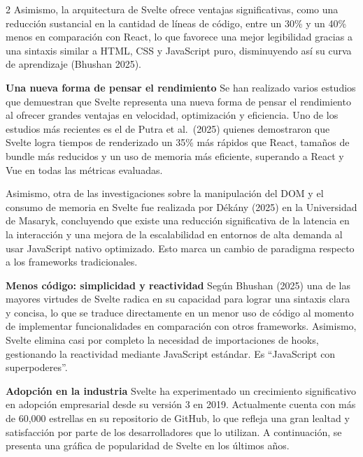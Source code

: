 \documentclass[12pt,spanish,Letterpaper,openany]{book}
\begin{document}
\begin {multicols}{2}
Asimismo, la arquitectura de Svelte ofrece ventajas significativas, como una reducción
sustancial en la cantidad de líneas de código, entre un 30\% y un 40\% menos en comparación
con React, lo que favorece una mejor legibilidad gracias a una sintaxis similar a HTML, CSS
y JavaScript puro, disminuyendo así su curva de aprendizaje (Bhushan 2025).

\bigskip

\textbf{Una nueva forma de pensar el rendimiento}
Se han realizado varios estudios que demuestran que Svelte representa una nueva forma de pensar el rendimiento al ofrecer grandes ventajas en velocidad, optimización y eficiencia. Uno de los estudios más recientes es el de Putra et al.~(2025) quienes demostraron que Svelte logra tiempos de renderizado un 35\% más rápidos que React, tamaños de bundle más reducidos y un uso de memoria más eficiente, superando a React y Vue en todas las métricas evaluadas.

Asimismo, otra de las investigaciones sobre la manipulación del DOM y el consumo de memoria en Svelte fue realizada por Dékány (2025) en la Universidad de Masaryk, concluyendo que existe una reducción significativa de la latencia en la interacción y una mejora de la escalabilidad en entornos de alta demanda al usar JavaScript nativo optimizado. Esto marca un cambio de paradigma respecto a los frameworks tradicionales.

\bigskip

\textbf{Menos código: simplicidad y reactividad}
Según Bhushan (2025) una de las mayores virtudes de Svelte radica en su capacidad para lograr una sintaxis clara y concisa, lo que se traduce directamente en un menor uso de código al momento de implementar funcionalidades en comparación con otros frameworks. Asimismo, Svelte elimina casi por completo la necesidad de importaciones de hooks, gestionando la reactividad mediante JavaScript estándar. Es ``JavaScript con superpoderes''.

\bigskip

\textbf{Adopción en la industria}
Svelte ha experimentado un crecimiento significativo en adopción empresarial desde su versión 3 en 2019. Actualmente cuenta con más de 60,000 estrellas en su repositorio de GitHub, lo que refleja una gran lealtad y satisfacción por parte de los desarrolladores que lo utilizan. A continuación, se presenta una gráfica de popularidad de Svelte en los últimos años.

\begin {flushleft}
\noindent\begin{minipage}[c]{\columnwidth}


\end{minipage}
\end{flushleft}
\end{multicols}
\end{document}
